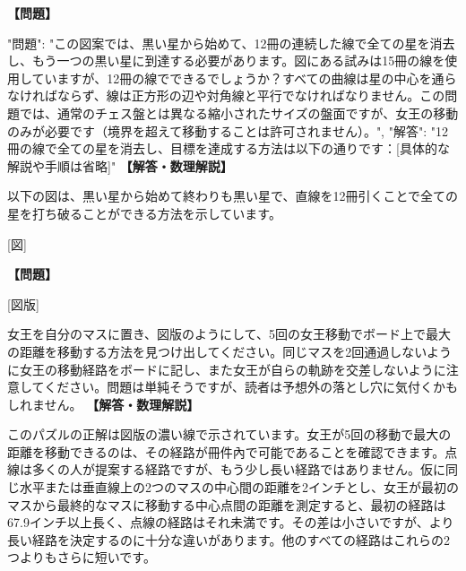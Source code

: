 \documentclass[10pt,a4paper,oneside,openany]{ltjsbook}
\begin{document}
\begin{tcolorbox}[colback=softblue,colframe=primaryblue,title=\textbf{第 332 問：THE FORTY-NINE STARS.},arc=2mm,boxrule=1pt,breakable]
\textbf{【問題】}\par\vspace{0.3em}
{
"問題": "この図案では、黒い星から始めて、12冊の連続した線で全ての星を消去し、もう一つの黒い星に到達する必要があります。図にある試みは15冊の線を使用していますが、12冊の線でできるでしょうか？すべての曲線は星の中心を通らなければならず、線は正方形の辺や対角線と平行でなければなりません。この問題では、通常のチェス盤とは異なる縮小されたサイズの盤面ですが、女王の移動のみが必要です（境界を超えて移動することは許可されません）。",
"解答": "12冊の線で全ての星を消去し、目標を達成する方法は以下の通りです：[具体的な解説や手順は省略]"
}
\tcblower
\textbf{【解答・数理解説】}\par\vspace{0.3em}
以下の図は、黒い星から始めて終わりも黒い星で、直線を12冊引くことで全ての星を打ち破ることができる方法を示しています。

[図]
\end{tcolorbox}

\begin{tcolorbox}[colback=softblue,colframe=primaryblue,title=\textbf{第 333 問：女王の旅路 （原題: THE QUEEN'S JOURNEY.）},arc=2mm,boxrule=1pt,breakable]
\textbf{【問題】}\par\vspace{0.3em}
[図版]

女王を自分のマスに置き、図版のようにして、5回の女王移動でボード上で最大の距離を移動する方法を見つけ出してください。同じマスを2回通過しないように女王の移動経路をボードに記し、また女王が自らの軌跡を交差しないように注意してください。問題は単純そうですが、読者は予想外の落とし穴に気付くかもしれません。
\tcblower
\textbf{【解答・数理解説】}\par\vspace{0.3em}
このパズルの正解は図版の濃い線で示されています。女王が5回の移動で最大の距離を移動できるのは、その経路が冊件內で可能であることを確認できます。点線は多くの人が提案する経路ですが、もう少し長い経路ではありません。仮に同じ水平または垂直線上の2つのマスの中心間の距離を2インチとし、女王が最初のマスから最終的なマスに移動する中心点間の距離を測定すると、最初の経路は67.9インチ以上長く、点線の経路はそれ未満です。その差は小さいですが、より長い経路を決定するのに十分な違いがあります。他のすべての経路はこれらの2つよりもさらに短いです。
\end{tcolorbox}
\end{document}
